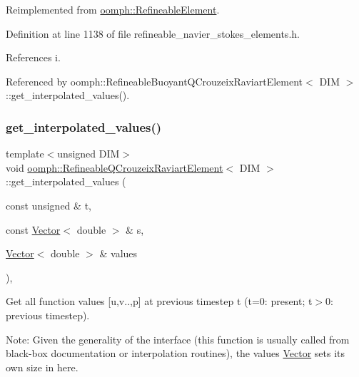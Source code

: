 Reimplemented from \hyperlink{classoomph_1_1RefineableElement_ad9a4f92880668a2373326d8306365c43}{oomph\+::\+Refineable\+Element}.



Definition at line 1138 of file refineable\+\_\+navier\+\_\+stokes\+\_\+elements.\+h.



References i.



Referenced by oomph\+::\+Refineable\+Buoyant\+Q\+Crouzeix\+Raviart\+Element$<$ D\+I\+M $>$\+::get\+\_\+interpolated\+\_\+values().

\mbox{\label{classoomph_1_1RefineableQCrouzeixRaviartElement_a077a2ea57fd4fbbe0cc195fd30ec889f}} 
\subsubsection{\texorpdfstring{get\+\_\+interpolated\+\_\+values()}{get\_interpolated\_values()}\hspace{0.1cm}{\footnotesize\ttfamily [2/2]}}
{\footnotesize\ttfamily template$<$unsigned D\+IM$>$ \\
void \hyperlink{classoomph_1_1RefineableQCrouzeixRaviartElement}{oomph\+::\+Refineable\+Q\+Crouzeix\+Raviart\+Element}$<$ D\+IM $>$\+::get\+\_\+interpolated\+\_\+values (\begin{DoxyParamCaption}\item[{const unsigned \&}]{t,  }\item[{const \hyperlink{classoomph_1_1Vector}{Vector}$<$ double $>$ \&}]{s,  }\item[{\hyperlink{classoomph_1_1Vector}{Vector}$<$ double $>$ \&}]{values }\end{DoxyParamCaption})\hspace{0.3cm}{\ttfamily [inline]}, {\ttfamily [virtual]}}



Get all function values \mbox{[}u,v..,p\mbox{]} at previous timestep t (t=0\+: present; t$>$0\+: previous timestep). 

Note\+: Given the generality of the interface (this function is usually called from black-\/box documentation or interpolation routines), the values \hyperlink{classoomph_1_1Vector}{Vector} sets its own size in here.

